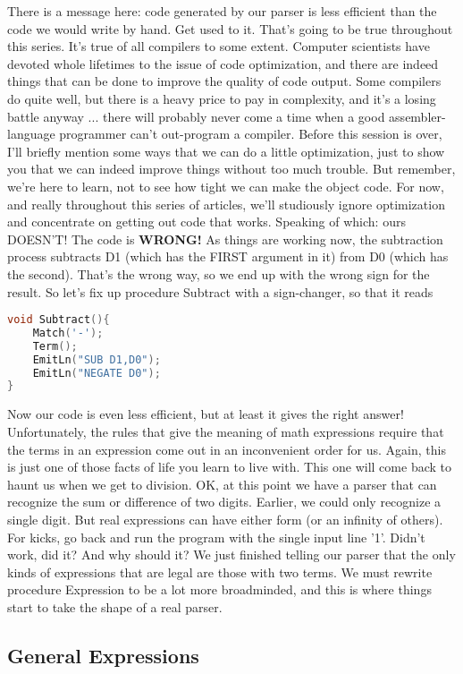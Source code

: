 There is a message here: code generated by our parser is less
efficient than the code we would write by hand. Get used to it.
That's going to be true throughout this series. It's true of all
compilers to some extent. Computer scientists have devoted whole
lifetimes to the issue of code optimization, and there are indeed
things that can be done to improve the quality of code output.
Some compilers do quite well, but there is a heavy price to pay
in complexity, and it's a losing battle anyway ... there will
probably never come a time when a good assembler-language programmer
can't out-program a compiler. Before this session is
over, I'll briefly mention some ways that we can do a little optimization,
just to show you that we can indeed improve things
without too much trouble. But remember, we're here to learn, not
to see how tight we can make the object code. For now, and
really throughout this series of articles, we'll studiously
ignore optimization and concentrate on getting out code that
works.
Speaking of which: ours DOESN'T! The code is \textbf{WRONG!} As things
are working now, the subtraction process subtracts D1 (which has
the FIRST argument in it) from D0 (which has the second). That's
the wrong way, so we end up with the wrong sign for the result.
So let's fix up procedure Subtract with a sign-changer, so that
it reads
\begin{lstlisting}[language=C]
void Subtract(){
	Match('-');
	Term();
	EmitLn("SUB D1,D0");
	EmitLn("NEGATE D0");
}
\end{lstlisting}
Now our code is even less efficient, but at least it gives the
right answer! Unfortunately, the rules that give the meaning of
math expressions require that the terms in an expression come out
in an inconvenient order for us. Again, this is just one of
those facts of life you learn to live with. This one will come
back to haunt us when we get to division.
OK, at this point we have a parser that can recognize the sum or
difference of two digits. Earlier, we could only recognize a
single digit. But real expressions can have either form (or an
infinity of others). For kicks, go back and run the program with
the single input line '1'.
Didn't work, did it? And why should it? We just finished
telling our parser that the only kinds of expressions that are
legal are those with two terms. We must rewrite procedure
Expression to be a lot more broadminded, and this is where things
start to take the shape of a real parser.

\subsection{General Expressions}

